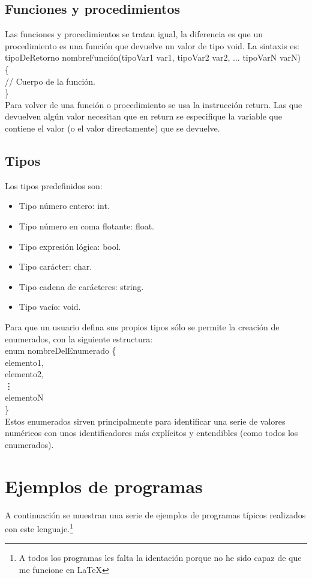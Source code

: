 \documentclass[a4paper, 12pt]{article}
\begin{document}
\subsection{Funciones y procedimientos}
Las funciones y procedimientos se tratan igual, la diferencia es que un procedimiento es una función que devuelve un valor de tipo void. La sintaxis es:\\

tipoDeRetorno nombreFunción(tipoVar1 var1, tipoVar2 var2, ... tipoVarN varN) \{ \\
// Cuerpo de la función.\\
\} \\

Para volver de una función o procedimiento se usa la instrucción return. Las que devuelven algún valor necesitan que en return se especifique la variable que contiene el valor (o el valor directamente) que se devuelve.
\subsection{Tipos}
Los tipos predefinidos son:
\begin{itemize}
\item Tipo número entero: int.
\item Tipo número en coma flotante: float.
\item Tipo expresión lógica: bool.
\item Tipo carácter: char.
\item Tipo cadena de carácteres: string.
\item Tipo vacío: void.
\end{itemize}

Para que un usuario defina sus propios tipos sólo se permite la creación de enumerados, con la siguiente estructura:\\

enum nombreDelEnumerado \{ \\
elemento1,\\
elemento2,\\
\vdots\\
elementoN\\
\} \\

Estos enumerados sirven principalmente para identificar una serie de valores numéricos con unos identificadores más explícitos y entendibles (como todos los enumerados).
\newpage

\section{Ejemplos de programas}
A continuación se muestran una serie de ejemplos de programas típicos realizados con este lenguaje.\footnote{A todos los programas les falta la identación porque no he sido capaz de que me funcione en \LaTeX}
\end{document}
